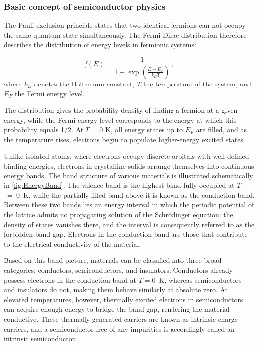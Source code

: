 \subsubsection{Basic concept of semiconductor physics}

The Pauli exclusion principle states that two identical fermions can not occupy the same quantum state simultaneously. The Fermi-Dirac distribution therefore describes the distribution of energy levels in fermionic systems:

\begin{equation}
    f(E)=\frac{1}{1+\exp\left( \displaystyle \frac{E-E_F}{k_BT} \right)} \, ,
    \label{eq:fermidirac}
\end{equation}
where $k_B$ denotes the Boltzmann constant, $T$ the temperature of the system, and $E_F$ the Fermi energy level.

The distribution gives the probability density of finding a fermion at a given energy, while the Fermi energy level corresponds to the energy at which this probability equals 1/2. At $T$ = 0 K, all energy states up to $E_F$ are filled, and as the temperature rises, electrons begin to populate higher-energy excited states. 

\vspace{0.5 cm}

Unlike isolated atoms, where electrons occupy discrete orbitals with well-defined binding energies, electrons in crystalline solids arrange themselves into continuous energy bands. The band structure of various materials is illustrated schematically in \cref{fig:EnergyBand}. The valence band is the highest band fully occupied at $T$~=~0~K, while the partially filled band above it is known as the conduction band. Between these two bands lies an energy interval in which the periodic potential of the lattice admits no propagating solution of the Schr\"odinger equation: the density of states vanishes there, and the interval is consequently referred to as the forbidden band gap. Electrons in the conduction band are those that contribute to the electrical conductivity of the material. 

Based on this band picture, materials can be classified into three broad categories: conductors, semiconductors, and insulators. Conductors already possess electrons in the conduction band at $T=0$~K, whereas semiconductors and insulators do not, making them behave similarly at absolute zero. At elevated temperatures, however, thermally excited electrons in semiconductors can acquire enough energy to bridge the band gap, rendering the material conductive. These thermally generated carriers are known as intrinsic charge carriers, and a semiconductor free of any impurities is accordingly called an intrinsic semiconductor.

